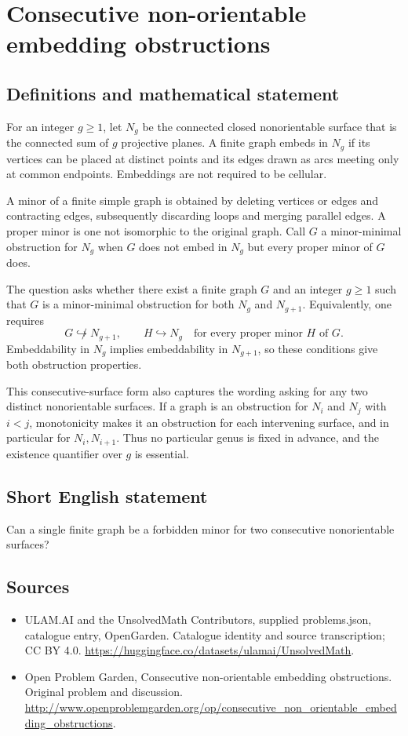 \documentclass[11pt,a4paper]{article}
\begin{document}
\section*{Consecutive non-orientable embedding obstructions}\label{statement}

\subsection{Definitions and mathematical statement}
For an integer $g\ge1$, let $N_g$ be the connected closed nonorientable surface that is the connected sum of $g$ projective planes. A finite graph embeds in $N_g$ if its vertices can be placed at distinct points and its edges drawn as arcs meeting only at common endpoints. Embeddings are not required to be cellular.

A minor of a finite simple graph is obtained by deleting vertices or edges and contracting edges, subsequently discarding loops and merging parallel edges. A proper minor is one not isomorphic to the original graph. Call $G$ a minor-minimal obstruction for $N_g$ when $G$ does not embed in $N_g$ but every proper minor of $G$ does.

The question asks whether there exist a finite graph $G$ and an integer $g\ge1$ such that $G$ is a minor-minimal obstruction for both $N_g$ and $N_{g+1}$. Equivalently, one requires
\[
 G\not\hookrightarrow N_{g+1},\qquad
 H\hookrightarrow N_g\quad\text{for every proper minor }H\text{ of }G.
\]
Embeddability in $N_g$ implies embeddability in $N_{g+1}$, so these conditions give both obstruction properties.

This consecutive-surface form also captures the wording asking for any two distinct nonorientable surfaces. If a graph is an obstruction for $N_i$ and $N_j$ with $i<j$, monotonicity makes it an obstruction for each intervening surface, and in particular for $N_i,N_{i+1}$. Thus no particular genus is fixed in advance, and the existence quantifier over $g$ is essential.
\subsection{Short English statement}
Can a single finite graph be a forbidden minor for two consecutive nonorientable surfaces?
\subsection{Sources}
\begin{itemize}
\item[S1] ULAM.AI and the UnsolvedMath Contributors, supplied problems.json, catalogue entry, OpenGarden. Catalogue identity and source transcription; CC BY 4.0.
\url{https://huggingface.co/datasets/ulamai/UnsolvedMath}.
\item[S2] Open Problem Garden, Consecutive non-orientable embedding obstructions. Original problem and discussion.
\url{http://www.openproblemgarden.org/op/consecutive_non_orientable_embedding_obstructions}.
\end{itemize}
\end{document}
